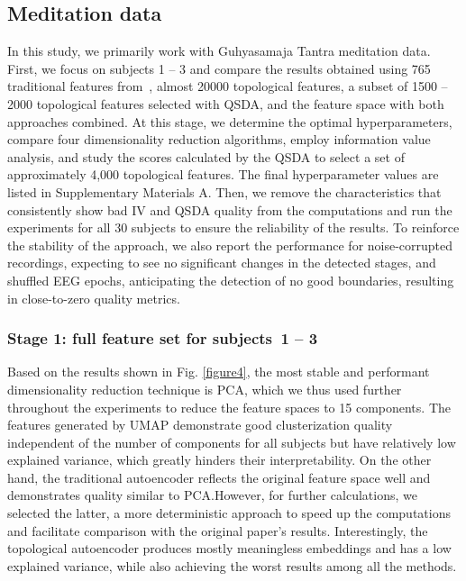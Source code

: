 \documentclass[journal,twoside,web]{ieeecolor2}
\begin{document}
\subsection{Meditation data}

In this study, we primarily work with Guhyasamaja Tantra meditation data. First, we focus on subjects 1 -- 3 and compare the results obtained using 765 traditional features from~\cite{SDA}, almost 20000 topological features, a subset of 1500 -- 2000 topological features selected with QSDA, and the feature space with both approaches combined. At this stage, we determine the optimal hyperparameters, compare four dimensionality reduction algorithms, employ information value analysis, and study the scores calculated by the QSDA to select a set of approximately 4,000 topological features. The final hyperparameter values are listed in Supplementary Materials A. Then, we remove the characteristics that consistently show bad IV and QSDA quality from the computations and run the experiments for all 30 subjects to ensure the reliability of the results. To reinforce the stability of the approach, we also report the performance for noise-corrupted recordings, expecting to see no significant changes in the detected stages, and shuffled EEG epochs, anticipating the detection of no good boundaries, resulting in close-to-zero quality metrics.

\subsubsection{Stage 1: full feature set for subjects~1 -- 3}

Based on the results shown in Fig. \ref{figure4}, the most stable and performant dimensionality reduction technique is PCA, which we thus used further throughout the experiments to reduce the feature spaces to 15 components. The features generated by UMAP demonstrate good clusterization quality independent of the number of components for all subjects but have relatively low explained variance, which greatly hinders their interpretability. On the other hand, the traditional autoencoder reflects the original feature space well and demonstrates quality similar to PCA.\@ However, for further calculations, we selected the latter, a more deterministic approach to speed up the computations and facilitate comparison with the original paper's results. Interestingly, the topological autoencoder produces mostly meaningless embeddings and has a low explained variance, while also achieving the worst results among all the methods. 
\end{document}
